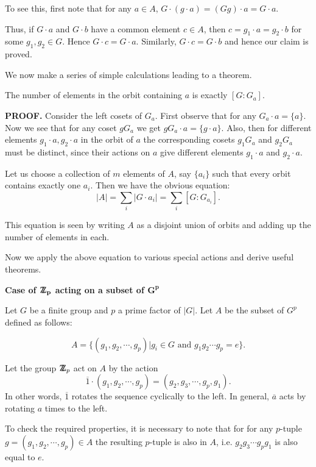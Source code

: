 \documentclass[12pt]{article}
\def\DZ{ \mbox{\rm Z \kern -0.75em Z} }
\begin{document}
To see this, first note that for any $a\in A$, 
 $G\cdot (g\cdot a) = (Gg)\cdot a = G\cdot
a$. 

Thus, if $G\cdot a$ and $G\cdot b $ have a common element $c\in A$,
then $c=g_1\cdot a = g_2\cdot b $ for some $g_1,g_2 \in G$.
Hence $G\cdot c= G\cdot a$.
Similarly, $G\cdot c = G\cdot b$ and hence our claim is proved.

We now make a series of simple calculations leading to a theorem.
\begin{description}
\item[Orbit length]

The number of elements in the orbit containing $a$
is exactly $[G:G_a]$.

{\bf PROOF.} Consider the left cosets of $G_a$. First observe that 
for any $G_a\cdot a = \{a\}.$ Now we see that for any coset
$gG_a$ we get $gG_a\cdot a = \{g\cdot a\}$. Also, then for different
elements $g_1\cdot a, g_2\cdot a$ in the orbit of $a$ the corresponding
cosets $g_1G_a$ and $g_2G_a$ must be distinct, since their actions on
$a$ give different elements $g_1\cdot a$ and $g_2\cdot a$.


\item[Orbit Equation] Let us choose a collection of $m$ elements of $A$, say $\{a_i\}$ such
that every orbit contains exactly one  $a_i$. Then we have the obvious  
equation:
$$|A| = \sum_i |G\cdot a_i| = \sum_i[G:G_{a_i}].$$

This equation is seen by writing $A$ as a disjoint union of orbits and
adding up the number of elements in each. 

Now we apply the above equation to various special actions and
derive useful theorems.

\item {\bf Case of $\mathbf{\DZ_p}$  acting on a subset of  $\mathbf{G^p}$}

Let $G$ be a finite group and $p$ a prime factor of $|G|$. 
Let $A$ be the subset of $G^p$ defined as follows:

$$A = \{ (g_1,g_2,\cdots,g_p) | g_i \in G \mbox{ and } g_1g_2\cdots g_p =e\}.$$

Let the group  $\DZ_p$ act on $A$ by the action 
$$\overline{1}\cdot (g_1,g_2,\cdots,g_p) = (g_2,g_3,\cdots,g_p,g_1).$$
In other words, $\overline{1}$ rotates the sequence cyclically to the
left. In general, $\overline{a}$ acts by rotating $a$ times to the left. 

To check the required properties, it is necessary to note that for for
any $p$-tuple $g=(g_1,g_2,\cdots,g_p)\in A$ the resulting $p$-tuple is
also in $A$, i.e. $g_2g_3\cdots g_pg_1$ is also equal to $e$.


\end{description}
\end{document}
